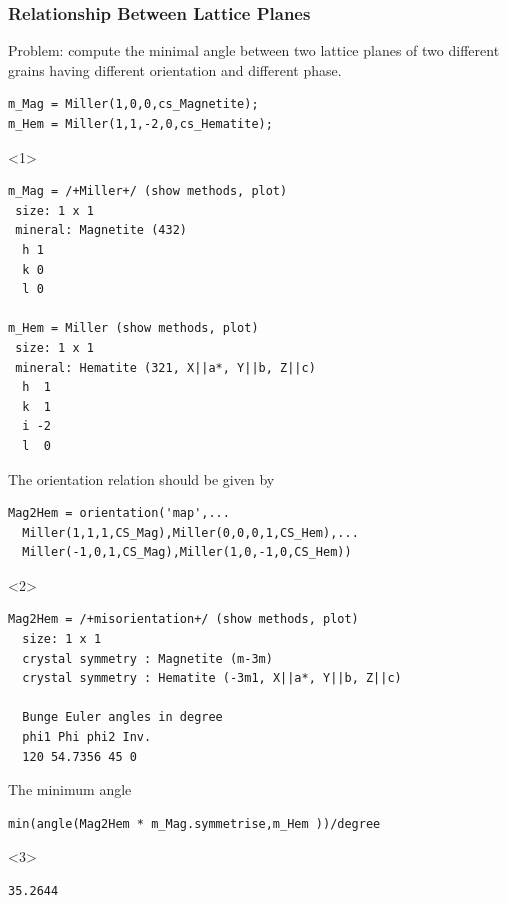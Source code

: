 \documentclass[compress]{beamer}
\begin{document}
\begin{frame}[fragile]
  \frametitle{Relationship Between Lattice Planes}

  \begin{overlayarea}{\textwidth}{8cm}

  Problem: compute the minimal angle between two lattice planes of two
  different grains having different orientation and different phase.
 \begin{lstlisting}[style=input]
m_Mag = Miller(1,0,0,cs_Magnetite);
m_Hem = Miller(1,1,-2,0,cs_Hematite);
 \end{lstlisting}
  \begin{onlyenv}<1>
    \vspace{-.3cm}
    \begin{lstlisting}[style=output]
m_Mag = /+Miller+/ (show methods, plot)
 size: 1 x 1
 mineral: Magnetite (432)
  h 1
  k 0
  l 0

m_Hem = Miller (show methods, plot)
 size: 1 x 1
 mineral: Hematite (321, X||a*, Y||b, Z||c)
  h  1
  k  1
  i -2
  l  0
\end{lstlisting}
  \end{onlyenv}

  \pause
  \medskip

  The orientation relation should be given by
  \begin{lstlisting}[style=input]
Mag2Hem = orientation('map',...
  Miller(1,1,1,CS_Mag),Miller(0,0,0,1,CS_Hem),...
  Miller(-1,0,1,CS_Mag),Miller(1,0,-1,0,CS_Hem))
  \end{lstlisting}
  \begin{onlyenv}<2>
    \vspace{-0.3cm}
    \begin{lstlisting}[style=output]
Mag2Hem = /+misorientation+/ (show methods, plot)
  size: 1 x 1
  crystal symmetry : Magnetite (m-3m)
  crystal symmetry : Hematite (-3m1, X||a*, Y||b, Z||c)

  Bunge Euler angles in degree
  phi1 Phi phi2 Inv.
  120 54.7356 45 0
    \end{lstlisting}
  \end{onlyenv}

  \pause
  \medskip

  The minimum angle
  \begin{lstlisting}[style=input]
min(angle(Mag2Hem * m_Mag.symmetrise,m_Hem ))/degree
 \end{lstlisting}
  \begin{onlyenv}<3>
    \vspace{-.3cm}
    \begin{lstlisting}[style=output]
  35.2644
    \end{lstlisting}
  \end{onlyenv}

\end{overlayarea}

\end{frame}
\end{document}
